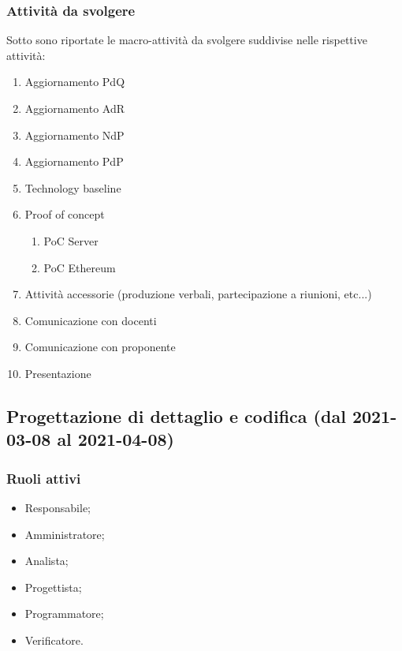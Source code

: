 \subsubsection{Attività da svolgere}
Sotto sono riportate le macro-attività da svolgere suddivise nelle rispettive attività:
\begin{enumerate}
	\item Aggiornamento PdQ
	\item Aggiornamento AdR
	\item Aggiornamento NdP
	\item Aggiornamento PdP
	\item Technology baseline
	\item Proof of concept
	\begin{enumerate}
		\item PoC Server
		\item PoC Ethereum
	\end{enumerate}
	\item Attività accessorie (produzione verbali, partecipazione a riunioni, etc...)
	\item Comunicazione con docenti
	\item Comunicazione con proponente
	\item Presentazione
\end{enumerate}



\subsection{Progettazione di dettaglio e codifica (dal 2021-03-08 al 2021-04-08)}


\subsubsection{Ruoli attivi}
\begin{itemize}
	\item Responsabile;
	\item Amministratore;
	\item Analista;
	\item Progettista;
	\item Programmatore;
	\item Verificatore.
\end{itemize}

